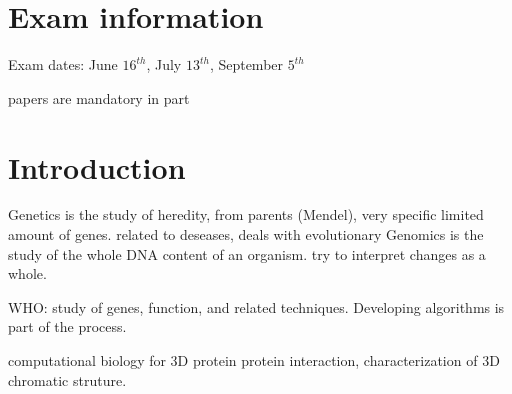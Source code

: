 \section{Exam information}
Exam dates: June $16^{th}$, July $13^{th}$, September $5^{th}$

papers are mandatory in part

\section{Introduction}

Genetics is the study of heredity, from parents (Mendel), very specific limited amount of genes. related to deseases, deals with evolutionary
Genomics is the study of the whole DNA content of an organism. try to interpret changes as a whole. 

WHO: study of genes, function, and related techniques. Developing algorithms is part of the process.

computational biology for 3D protein protein interaction, characterization of 3D chromatic struture. 



